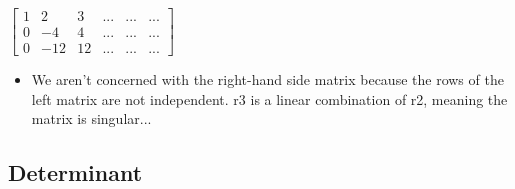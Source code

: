 \begin{itemize}
    $\begin{bmatrix}
        1 & 2 & 3 & ... & ... & ... \\
        0 & -4 & 4 & ... & ... & ... \\
        0 & -12 & 12 & ... & ... & ...
    \end{bmatrix}$

    \begin{itemize}
        \item We aren't concerned with the right-hand side matrix because the rows of the left matrix are not independent. r3 is a linear combination of r2, meaning the matrix is singular... 
    \end{itemize}

\end{itemize}

\subsection{Determinant}

